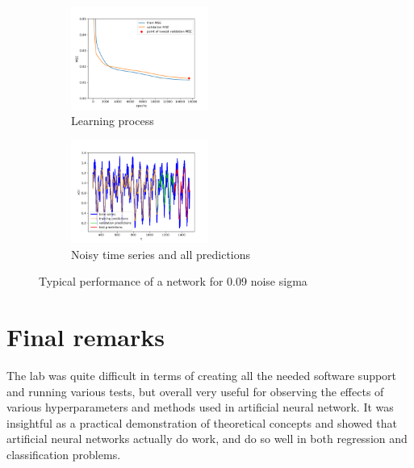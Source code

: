 \documentclass[a4paper]{article}
\begin{document}
\begin{figure}[h!]
	\begin{subfigure}{.5\linewidth}
		\includegraphics[width=170px]{img/4_2_learning.png}
		\centering
		\caption{\small Learning process}
	\end{subfigure}
	\begin{subfigure}{.5\linewidth}
		\centering
		\includegraphics[width=170px]{img/4_2_predictions.png}
		\caption{\small Noisy time series and all predictions}
	\end{subfigure}
	\caption{Typical performance of a network for 0.09 noise sigma }
	\label{fig:learning_process}
\end{figure}

\section{Final remarks} %
The lab was quite difficult in terms of creating all the needed software support and running various tests, but overall very useful for observing the effects of various hyperparameters and methods used in artificial neural network. It was insightful as a practical demonstration of theoretical concepts and showed that artificial neural networks actually do work, and do so well in both regression and classification problems.
\end{document}
